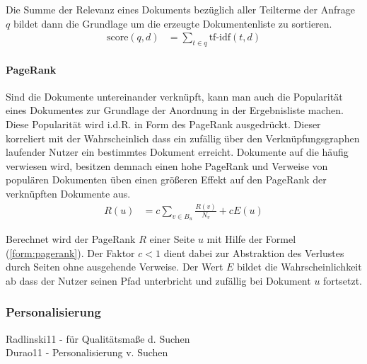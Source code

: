 Die Summe der Relevanz eines Dokuments bezüglich aller Teilterme der Anfrage $q$ bildet dann die Grundlage um die erzeugte Dokumentenliste zu sortieren.\citep{Manning2008} 
\begin{align}
\text{score}(q,d) & = \sum_{t \in q}{\text{tf-idf}(t,d)}
\end{align}

\paragraph{PageRank} Sind die Dokumente untereinander verknüpft, kann man auch die Popularität eines Dokumentes zur Grundlage der Anordnung in der Ergebnisliste machen. Diese Popularität wird i.d.R. in Form des PageRank ausgedrückt. Dieser korreliert mit der Wahrscheinlich dass ein zufällig über den Verknüpfungsgraphen laufender Nutzer ein bestimmtes Dokument erreicht. Dokumente auf die häufig verwiesen wird, besitzen demnach einen hohe PageRank und Verweise von populären Dokumenten üben einen größeren Effekt auf den PageRank der verknüpften Dokumente aus.
\begin{align}
R(u) & = c \sum_{v \in B_u}{\frac{R(v)}{N_v}} + cE(u) \label{form:pagerank}
\end{align}

Berechnet wird der PageRank $R$ einer Seite $u$ mit Hilfe der Formel (\ref{form:pagerank}). Der Faktor $c < 1$ dient dabei zur Abstraktion des Verlustes durch Seiten ohne ausgehende Verweise. Der Wert $E$ bildet die Wahrscheinlichkeit ab dass der Nutzer seinen Pfad unterbricht und zufällig bei Dokument $u$ fortsetzt.\citep{pagerank,Manning2008}




\subsubsection{Personalisierung}

Radlinski11 - für Qualitätsmaße d. Suchen \\
Durao11 - Personalisierung v. Suchen